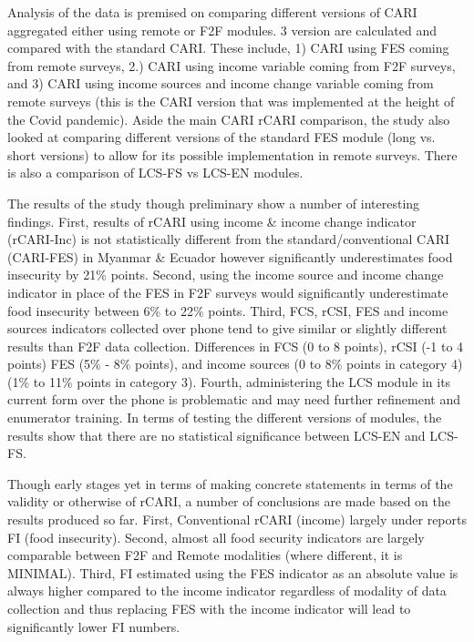 \documentclass[11pt,harvard]{article}
\begin{document}
Analysis of the data is premised on comparing different versions of CARI aggregated either using remote or F2F modules. 3 version are calculated and compared with the standard CARI. These include, 1) CARI using FES coming from remote surveys, 2.) CARI using income variable coming from F2F surveys, and 3) CARI using income sources and income change variable coming from remote surveys (this is the CARI version that was implemented at the height of the Covid pandemic). Aside the main CARI rCARI comparison, the study also looked at comparing different versions of the standard FES module (long vs. short versions) to allow for its possible implementation in remote surveys. There is also a comparison of LCS-FS vs LCS-EN modules.

The results of the study though preliminary show a number of interesting findings. First, results of rCARI using income \& income change indicator (rCARI-Inc) is not statistically different from the standard/conventional CARI (CARI-FES) in Myanmar \& Ecuador however significantly underestimates food insecurity by 21\% points. Second, using the income source and income change indicator in place of the FES in F2F surveys would significantly underestimate food insecurity between 6\% to 22\% points. Third, FCS, rCSI, FES and income sources indicators collected over phone tend to give similar or slightly different results than F2F data collection. Differences in FCS (0 to 8 points), rCSI (-1 to 4 points) FES (5\% - 8\% points), and income sources (0 to 8\% points in category 4) (1\% to 11\% points in category 3). Fourth, administering the LCS module in its current form over the phone is problematic and may need further refinement and enumerator training. In terms of testing the different versions of modules, the results show that there are no statistical significance between LCS-EN and LCS-FS. 

Though early stages yet in terms of making concrete statements in terms of the validity or otherwise of rCARI, a number of conclusions are made based on the results produced so far. First, Conventional rCARI (income) largely under reports FI (food insecurity). Second, almost all food security indicators are largely comparable between F2F and Remote modalities (where different, it is MINIMAL). Third, FI estimated using the FES indicator as an absolute value is always higher compared to the income indicator regardless of modality of data collection and thus replacing FES with the income indicator will lead to significantly lower FI numbers.
\end{document}
